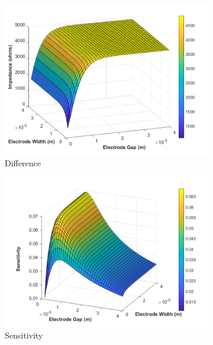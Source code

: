 \begin{figure}[h]
    \centering
    \begin{subfigure}[b]{0.49\textwidth}
        \centering
        \includegraphics[width=\textwidth]{images/analytic_sun_difference_expanded.png}
        \caption{Difference}
    \end{subfigure}
    \hfill
    \begin{subfigure}[b]{0.49\textwidth}
        \centering
        \includegraphics[width=\textwidth]{images/analytic_sun_surface_expanded.png}
        \caption{Sensitivity}
    \end{subfigure}
    \\
    \vspace{0.1 in}
    \begin{subfigure}[b]{0.49\textwidth}

\end{subfigure}
\end{figure}
